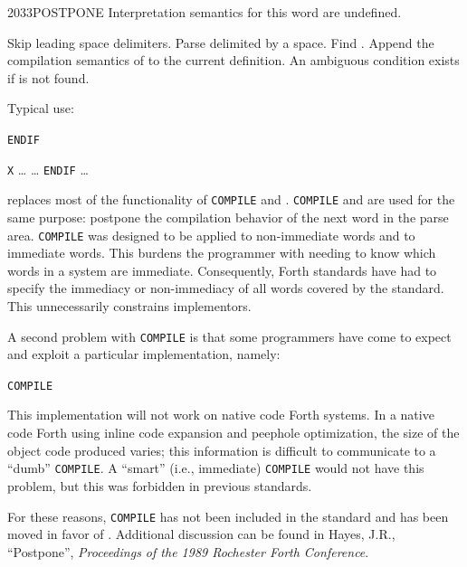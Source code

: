 \begin{worddef}{2033}{POSTPONE}
\interpret
	Interpretation semantics for this word are undefined.

\compile

	Skip leading space delimiters. Parse  delimited by
	a space. Find . Append the compilation semantics of
	 to the current definition. An ambiguous condition
	exists if  is not found.


	\begin{rationale} %
		Typical use:

		\tab \word{:} \texttt{ENDIF}
			 
		\word{;} 

		\tab \word{:} \texttt{X} {\ldots}
			 {\ldots} \texttt{ENDIF}
		{\ldots} \word{;}

		 replaces most of the functionality of
		\texttt{COMPILE} and  \word{[COMPILE]}. \texttt{COMPILE} and
	\linebreak
		\word{[COMPILE]} are used for the same purpose: postpone the
		compilation behavior of the next word in the parse area.
		\texttt{COMPILE} was designed to be applied to non-immediate
		words and \word{[COMPILE]} to immediate words. This burdens
		the programmer with needing to know which words in a system
		are immediate. Consequently, Forth standards have had to
		specify the immediacy or non-immediacy of all words covered by
		the standard. This unnecessarily constrains implementors.

		A second problem with \texttt{COMPILE} is that some
		programmers have come to expect and exploit a particular
		implementation, namely:

		\tab \word{:} \texttt{COMPILE} 
			  \word{,}  
		\word{;}

		This implementation will not work on native code Forth systems.
		In a native code Forth using inline code expansion and peephole
		optimization, the size of the object code produced varies; this
		information is difficult to communicate to a ``dumb''
		\texttt{COMPILE}. A ``smart'' (i.e., immediate) \texttt{COMPILE}
		would not have this problem, but this was forbidden in previous
		standards.

		For these reasons, \texttt{COMPILE} has not been included in
		the standard and \word{[COMPILE]} has been moved in favor of
		. Additional discussion can be found in Hayes,
		J.R., ``Postpone'', \emph{Proceedings of the 1989 Rochester
		Forth Conference}.
	\end{rationale}


\end{worddef}
